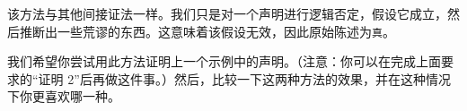 该方法与其他间接证法一样。我们只是对一个声明进行逻辑否定，假设它成立，然后推断出一些荒谬的东西。这意味着该假设无效，因此原始陈述为\verb|真|。

我们希望你尝试用此方法证明上一个示例中的声明。（注意：你可以在完成上面要求的``证明 2''后再做这件事。）然后，比较一下这两种方法的效果，并在这种情况下你更喜欢哪一种。

\begin{center}
    \noindent {}
\end{center}